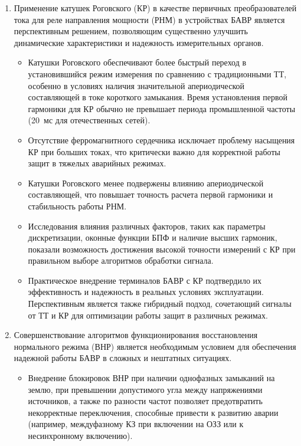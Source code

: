\begin{enumerate}[label=\arabic*)]
    \item Применение катушек Роговского (КР) в качестве первичных преобразователей тока для реле направления мощности (РНМ) в устройствах БАВР является перспективным решением, позволяющим существенно улучшить динамические характеристики и надежность измерительных органов.
    \begin{itemize}
        \item Катушки Роговского обеспечивают более быстрый переход в установившийся режим измерения по сравнению с традиционными ТТ, особенно в условиях наличия значительной апериодической составляющей в токе короткого замыкания. Время установления первой гармоники для КР обычно не превышает периода промышленной частоты (20~мс для отечественных сетей).
        \item Отсутствие ферромагнитного сердечника исключает проблему насыщения КР при больших токах, что критически важно для корректной работы защит в тяжелых аварийных режимах.
        \item Катушки Роговского менее подвержены влиянию апериодической составляющей, что повышает точность расчета первой гармоники и стабильность работы РНМ.
        \item Исследования влияния различных факторов, таких как параметры дискретизации, оконные функции БПФ и наличие высших гармоник, показали возможность достижения высокой точности измерений с КР при правильном выборе алгоритмов обработки сигнала.
        \item Практическое внедрение терминалов БАВР с КР подтвердило их эффективность и надежность в реальных условиях эксплуатации. Перспективным является также гибридный подход, сочетающий сигналы от ТТ и КР для оптимизации работы защит в различных режимах.
    \end{itemize}
    \item Совершенствование алгоритмов функционирования восстановления нормального режима (ВНР) является необходимым условием для обеспечения надежной работы БАВР в сложных и нештатных ситуациях.
    \begin{itemize}
        \item Внедрение блокировок ВНР при наличии однофазных замыканий на землю, при превышении допустимого угла между напряжениями источников, а также по разности частот позволяет предотвратить некорректные переключения, способные привести к развитию аварии (например, междуфазному КЗ при включении на ОЗЗ или к несинхронному включению).

\end{itemize}
\end{enumerate}
